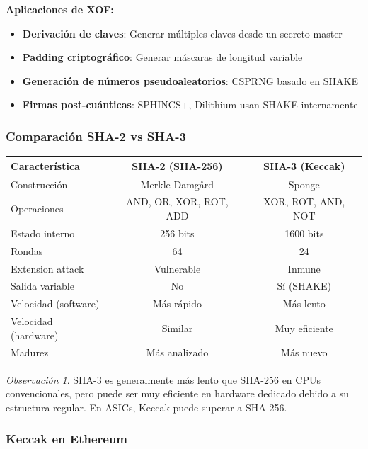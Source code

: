 \documentclass[11pt,a4paper,twoside,openright]{book}
\theoremstyle{definition}
\theoremstyle{plain}
\theoremstyle{remark}
\newtheorem{remark}{Observación}[chapter]
\begin{document}
\textbf{Aplicaciones de XOF:}
\begin{itemize}
    \item \textbf{Derivación de claves}: Generar múltiples claves desde un secreto master
    \item \textbf{Padding criptográfico}: Generar máscaras de longitud variable
    \item \textbf{Generación de números pseudoaleatorios}: CSPRNG basado en SHAKE
    \item \textbf{Firmas post-cuánticas}: SPHINCS+, Dilithium usan SHAKE internamente
\end{itemize}

\subsubsection{Comparación SHA-2 vs SHA-3}

\begin{center}
\begin{tabular}{lcc}
\toprule
\textbf{Característica} & \textbf{SHA-2 (SHA-256)} & \textbf{SHA-3 (Keccak)} \\
\midrule
Construcción & Merkle-Damgård & Sponge \\
Operaciones & AND, OR, XOR, ROT, ADD & XOR, ROT, AND, NOT \\
Estado interno & 256 bits & 1600 bits \\
Rondas & 64 & 24 \\
Extension attack & Vulnerable & Inmune \\
Salida variable & No & Sí (SHAKE) \\
Velocidad (software) & Más rápido & Más lento \\
Velocidad (hardware) & Similar & Muy eficiente \\
Madurez & Más analizado & Más nuevo \\
\bottomrule
\end{tabular}
\end{center}

\begin{remark}
SHA-3 es generalmente más lento que SHA-256 en CPUs convencionales, pero puede ser muy eficiente en hardware dedicado debido a su estructura regular. En ASICs, Keccak puede superar a SHA-256.
\end{remark}

\subsubsection{Keccak en Ethereum}
\end{document}

